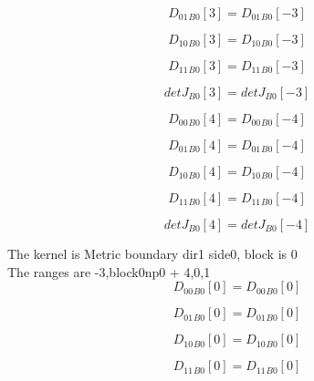 \documentclass{article}
\begin{document}
\begin{dmath}{D_{01}{_{B0}}}[{3}] = {D_{01}{_{B0}}}[{-3}]\end{dmath}

\begin{dmath}{D_{10}{_{B0}}}[{3}] = {D_{10}{_{B0}}}[{-3}]\end{dmath}

\begin{dmath}{D_{11}{_{B0}}}[{3}] = {D_{11}{_{B0}}}[{-3}]\end{dmath}

\begin{dmath}{detJ{_{B0}}}[{3}] = {detJ{_{B0}}}[{-3}]\end{dmath}

\begin{dmath}{D_{00}{_{B0}}}[{4}] = {D_{00}{_{B0}}}[{-4}]\end{dmath}

\begin{dmath}{D_{01}{_{B0}}}[{4}] = {D_{01}{_{B0}}}[{-4}]\end{dmath}

\begin{dmath}{D_{10}{_{B0}}}[{4}] = {D_{10}{_{B0}}}[{-4}]\end{dmath}

\begin{dmath}{D_{11}{_{B0}}}[{4}] = {D_{11}{_{B0}}}[{-4}]\end{dmath}

\begin{dmath}{detJ{_{B0}}}[{4}] = {detJ{_{B0}}}[{-4}]\end{dmath}

\noindent The kernel is Metric boundary dir1 side0, block is 0\\\noindent The ranges are -3,block0np0 + 4,0,1\\\begin{dmath}{D_{00}{_{B0}}}[{0}] = {D_{00}{_{B0}}}[{0}]\end{dmath}

\begin{dmath}{D_{01}{_{B0}}}[{0}] = {D_{01}{_{B0}}}[{0}]\end{dmath}

\begin{dmath}{D_{10}{_{B0}}}[{0}] = {D_{10}{_{B0}}}[{0}]\end{dmath}

\begin{dmath}{D_{11}{_{B0}}}[{0}] = {D_{11}{_{B0}}}[{0}]\end{dmath}
\end{document}
